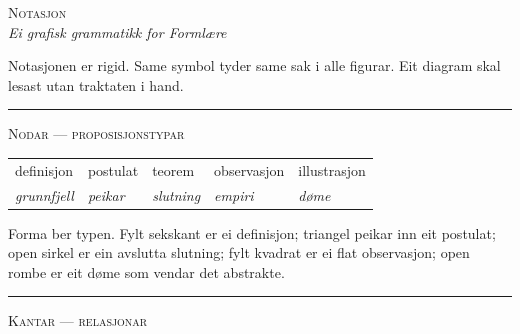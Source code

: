 \documentclass[a4paper,11pt]{article}
\begin{document}
\begin{center}
{\large\scshape Notasjon}\\[0.5em]
{\itshape Ei grafisk grammatikk for Formlære}
\end{center}

\vspace{0.4em}

Notasjonen er rigid. Same symbol tyder same sak i alle figurar. Eit diagram skal lesast utan traktaten i hand.

\vspace{0.3em}

\hrule

\vspace{0.4em}

{\scshape\small Nodar — proposisjonstypar}\\[0.3em]


\begin{tabular}{@{}p{2.6cm}p{2.6cm}p{2.6cm}p{2.6cm}p{2.6cm}@{}}
\footnotesize definisjon & \footnotesize postulat & \footnotesize teorem & \footnotesize observasjon & \footnotesize illustrasjon\\
\footnotesize\itshape grunnfjell & \footnotesize\itshape peikar & \footnotesize\itshape slutning & \footnotesize\itshape empiri & \footnotesize\itshape døme
\end{tabular}

\vspace{0.4em}

Forma ber typen. Fylt sekskant er ei definisjon; triangel peikar inn eit postulat; open sirkel er ein avslutta slutning; fylt kvadrat er ei flat observasjon; open rombe er eit døme som vendar det abstrakte.

\vspace{0.4em}

\hrule

\vspace{0.4em}

{\scshape\small Kantar — relasjonar}\\[0.6em]
\end{document}
